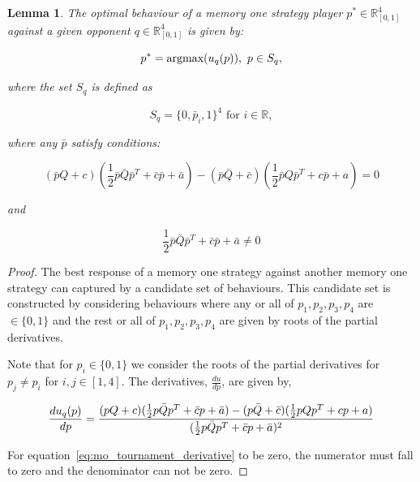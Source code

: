\documentclass[10pt]{article}
\newcommand{\R}{\mathbb{R}}
\newtheorem{lemma}[theorem]{Lemma}
\begin{document}
\begin{lemma}\label{lemma:memone_best_response}
    The optimal behaviour of a memory one strategy player \(p^* \in \R_{[0, 1]} ^ 4\)
    against a given opponent \(q \in \R_{[0, 1]} ^ 4\) is given by:

    \[p^* = \textnormal{argmax}(u_q(p)), \ p \in S_q,\]

    where the set \(S_q\) is defined as

    \[S_q = \{0, \bar{p}_i, 1 \}^4 \text{ for } i \in \R,\]

    where any \(\bar{p}\) satisfy conditions:

    {\small
    \begin{equation}\label{eq:derivative_numerator_condition}
        (\bar{p}Q + c) ( \frac{1}{2} \bar{p}  \bar{Q}  \bar{p}^T + \bar{c}  \bar{p} + \bar{a})
        - (\bar{p}\bar{Q} + \bar{c})( \frac{1}{2} \bar{p}  Q  \bar{p}^T + c \bar{p} + a) = 0
    \end{equation}}

    and

    {\small
    \begin{equation}\label{eq:derivative_denominator_condition}
        \frac{1}{2} \bar{p}  \bar{Q}  \bar{p}^T + \bar{c}  \bar{p} + \bar{a} \neq 0
    \end{equation}}
\end{lemma}

\begin{proof} The best response of a memory one strategy against another memory
    one strategy can captured by a candidate set of behaviours. This candidate
    set is constructed by considering behaviours where any or all of \(p_1, p_2,
    p_3, p_4\) are \(\in \{0, 1\}\) and the rest or all of \(p_1, p_2, p_3,
    p_4\) are given by roots of the partial derivatives.

    Note that for \(p_i \in \{0, 1\}\) we consider the roots of the partial
    derivatives for \(p_j \neq p_i\) for \(i,j \in [1, 4]\). The derivatives,
    \(\frac{du}{dp}\), are given by,

    \begin{equation}\label{eq:mo_derivative}
        \frac{du_q (p)}{dp}  = \frac{(pQ + c) ( \frac{1}{2} p  \bar{Q}  p^T + \bar{c}  p + \bar{a})
        - (p\bar{Q} + \bar{c})( \frac{1}{2} p  Q  p^T + c p + a)}
          {( \frac{1}{2} p  \bar{Q}  p^T + \bar{c}  p + \bar{a})^2} \\
    \end{equation}

    For equation~\ref{eq:mo_tournament_derivative} to be zero, the numerator must fall
    to zero and the denominator can not be zero.
\end{proof}
\end{document}
